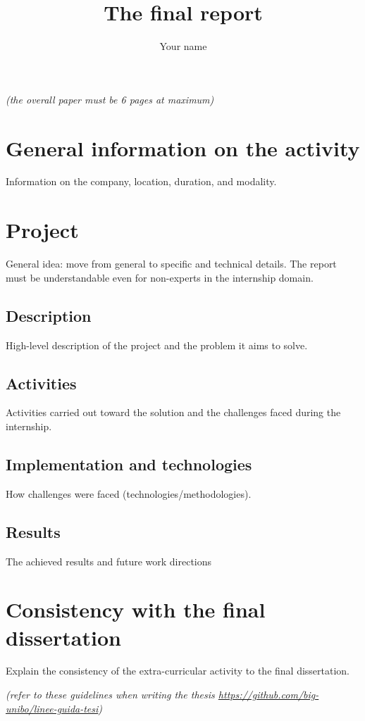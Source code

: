 \documentclass{article}
\title{The final report}
\author{Your name}
\begin{document}
\maketitle

\textit{(the overall paper must be 6 pages at maximum)}

\section{General information on the activity}
Information on the company, location, duration, and modality.

\section{Project}
General idea: move from general to specific and technical details.
The report must be understandable even for non-experts in the internship domain.

\subsection{Description}
High-level description of the project and the problem it aims to solve.

\subsection{Activities}
Activities carried out toward the solution and the challenges faced during the internship.

\subsection{Implementation and technologies}
How challenges were faced (technologies/methodologies).

\subsection{Results}
The achieved results and future work directions

\section{Consistency with the final dissertation}
Explain the consistency of the extra-curricular activity to the final dissertation. 

\textit{(refer to these guidelines when writing the thesis \url{https://github.com/big-unibo/linee-guida-tesi})}
\end{document}
